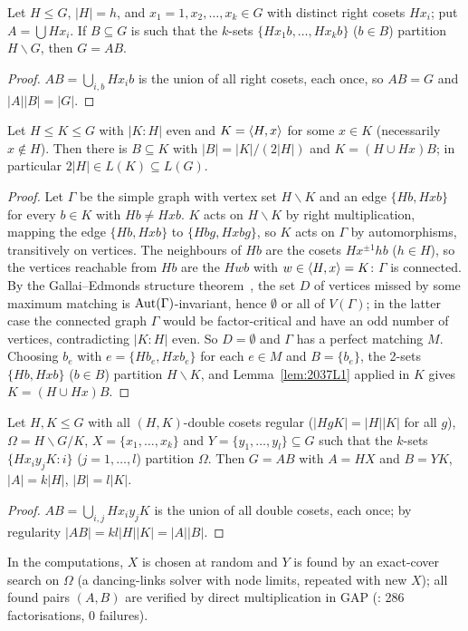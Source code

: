 \begin{lemma}\label{lem:2037L1}
Let $H\le G$, $|H|=h$, and $x_1=1,x_2,\dots,x_k\in G$ with distinct right cosets $Hx_i$; put $A=\bigcup Hx_i$. If
$B\subseteq G$ is such that the $k$-sets $\{Hx_1b,\dots,Hx_kb\}$ ($b\in B$) partition $H\backslash G$, then $G=AB$.
\end{lemma}
\begin{proof}
$AB=\bigcup_{i,b}Hx_ib$ is the union of all right cosets, each once, so $AB=G$ and $|A||B|=|G|$.
\end{proof}

\begin{theorem}\label{thm:2037T1}
Let $H\le K\le G$ with $|K:H|$ even and $K=\langle H,x\rangle$ for some $x\in K$ (necessarily $x\notin H$). Then there is
$B\subseteq K$ with $|B|=|K|/(2|H|)$ and $K=(H\cup Hx)B$; in particular $2|H|\in L(K)\subseteq L(G)$.
\end{theorem}
\begin{proof}
Let $\Gamma$ be the simple graph with vertex set $H\backslash K$ and an edge $\{Hb,Hxb\}$ for every $b\in K$ with
$Hb\ne Hxb$. $K$ acts on $H\backslash K$ by right multiplication, mapping the edge $\{Hb,Hxb\}$ to $\{Hbg,Hxbg\}$,
so $K$ acts on $\Gamma$ by automorphisms, transitively on vertices. The neighbours of $Hb$ are the cosets
$Hx^{\pm1}hb$ ($h\in H$), so the vertices reachable from $Hb$ are the $Hwb$ with $w\in\langle H,x\rangle=K$: $\Gamma$ is
connected. By the Gallai--Edmonds structure theorem~\cite{LP}, the set $D$ of vertices missed by some maximum
matching is $\operatorname{Aut}(\Gamma)$-invariant, hence $\emptyset$ or all of $V(\Gamma)$; in the latter case the connected
graph $\Gamma$ would be factor-critical and have an odd number of vertices, contradicting $|K:H|$ even. So $D=\emptyset$
and $\Gamma$ has a perfect matching $M$. Choosing $b_e$ with $e=\{Hb_e,Hxb_e\}$ for each $e\in M$ and $B=\{b_e\}$,
the 2-sets $\{Hb,Hxb\}$ ($b\in B$) partition $H\backslash K$, and Lemma~\ref{lem:2037L1} applied in $K$ gives
$K=(H\cup Hx)B$.
\end{proof}

\begin{lemma}\label{lem:2037L2}
Let $H,K\le G$ with all $(H,K)$-double cosets regular ($|HgK|=|H||K|$ for all $g$), $\Omega=H\backslash G/K$,
$X=\{x_1,\dots,x_k\}$ and $Y=\{y_1,\dots,y_l\}\subseteq G$ such that the $k$-sets $\{Hx_iy_jK:i\}$ ($j=1,\dots,l$)
partition $\Omega$. Then $G=AB$ with $A=HX$ and $B=YK$, $|A|=k|H|$, $|B|=l|K|$.
\end{lemma}
\begin{proof}
$AB=\bigcup_{i,j}Hx_iy_jK$ is the union of all double cosets, each once; by regularity $|AB|=kl|H||K|=|A||B|$.
\end{proof}
In the computations, $X$ is chosen at random and $Y$ is found by an exact-cover search on $\Omega$ (a dancing-links
solver with node limits, repeated with new $X$); all found pairs $(A,B)$ are verified by direct multiplication in
GAP (: 286 factorisations, 0 failures).

